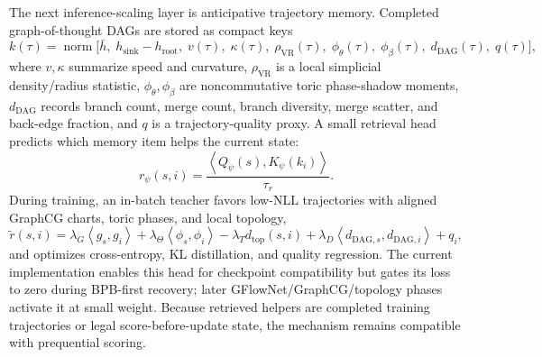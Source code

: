 \documentclass[10pt]{article}
\theoremstyle{definition}
\theoremstyle{plain}
\theoremstyle{remark}
\newcommand{\ip}[2]{\left\langle #1,#2\right\rangle}
\begin{document}
The next inference-scaling layer is anticipative trajectory memory.  Completed graph-of-thought DAGs are stored as compact keys
\begin{equation}
  k(\tau)=\operatorname{norm}\big[\bar h,\;h_{\mathrm{sink}}-h_{\mathrm{root}},\;v(\tau),\;\kappa(\tau),\;\rho_{\mathrm{VR}}(\tau),\;\phi_\theta(\tau),\;\phi_\beta(\tau),\;d_{\mathrm{DAG}}(\tau),\;q(\tau)\big],
\end{equation}
where \(v,\kappa\) summarize speed and curvature, \(\rho_{\mathrm{VR}}\) is a local simplicial density/radius statistic, \(\phi_\theta,\phi_\beta\) are noncommutative toric phase-shadow moments, \(d_{\mathrm{DAG}}\) records branch count, merge count, branch diversity, merge scatter, and back-edge fraction, and \(q\) is a trajectory-quality proxy.  A small retrieval head predicts which memory item helps the current state:
\begin{equation}
  r_\psi(s,i)=\frac{\ip{Q_\psi(s)}{K_\psi(k_i)}}{\tau_r}.
\end{equation}
During training, an in-batch teacher favors low-NLL trajectories with aligned GraphCG charts, toric phases, and local topology,
\begin{equation}
  \tilde r(s,i)=\lambda_G\ip{g_s}{g_i}+\lambda_\Theta\ip{\phi_s}{\phi_i}-\lambda_T d_{\mathrm{top}}(s,i)+\lambda_D\ip{d_{\mathrm{DAG},s}}{d_{\mathrm{DAG},i}}+q_i,
\end{equation}
and optimizes cross-entropy, KL distillation, and quality regression.  The current implementation enables this head for checkpoint compatibility but gates its loss to zero during BPB-first recovery; later GFlowNet/GraphCG/topology phases activate it at small weight.  Because retrieved helpers are completed training trajectories or legal score-before-update state, the mechanism remains compatible with prequential scoring.
\end{document}
